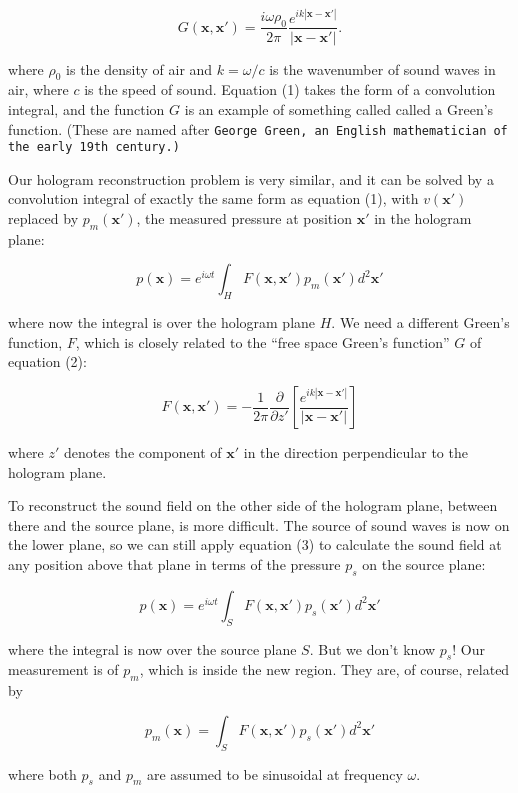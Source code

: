   $$G(\mathbf{x},\mathbf{x'})= \dfrac{i \omega \rho_0}{2 \pi}\dfrac{e^{i k 
  |\mathbf{x}-\mathbf{x'}|}}{|\mathbf{x}-\mathbf{x'}|} . \tag{2}$$ 

  where $\rho_0$ is the density of air and $k=\omega/c$ is the wavenumber of 
  sound waves in air, where $c$ is the speed of sound. Equation (1) takes the 
  form of a convolution integral, and the function $G$ is an example of 
  something called called a Green's function. (These are named after 
  \tt{}George Green\rm{}, an English mathematician of the early 19th century.) 

  Our hologram reconstruction problem is very similar, and it can be solved by 
  a convolution integral of exactly the same form as equation (1), with 
  $v(\mathbf{x'})$ replaced by $p_m(\mathbf{x'})$, the measured pressure at 
  position $\mathbf{x'}$ in the hologram plane: 

  $$p(\mathbf{x}) = e^{i \omega t} \int_H{F(\mathbf{x},\mathbf{x'}) 
  p_m(\mathbf{x'}) d^2 \mathbf{x'}} \tag{3}$$ 

  where now the integral is over the hologram plane $H$. We need a different 
  Green's function, $F$, which is closely related to the ``free space Green's 
  function'' $G$ of equation (2): 

  $$F(\mathbf{x},\mathbf{x'})=- \dfrac{1}{2 \pi} \dfrac{\partial}{\partial 
  z'}\left[ \dfrac{e^{i k 
  |\mathbf{x}-\mathbf{x'}|}}{|\mathbf{x}-\mathbf{x'}|}\right] \tag{4}$$ 

  where $z'$ denotes the component of $\mathbf{x'}$ in the direction 
  perpendicular to the hologram plane. 

  To reconstruct the sound field on the other side of the hologram plane, 
  between there and the source plane, is more difficult. The source of sound 
  waves is now on the lower plane, so we can still apply equation (3) to 
  calculate the sound field at any position above that plane in terms of the 
  pressure $p_s$ on the source plane: 

  $$p(\mathbf{x}) = e^{i \omega t} \int_S{F(\mathbf{x},\mathbf{x'}) 
  p_s(\mathbf{x'}) d^2 \mathbf{x'}} \tag{5}$$ 

  where the integral is now over the source plane $S$. But we don't know $p_s$! 
  Our measurement is of $p_m$, which is inside the new region. They are, of 
  course, related by 

  $$p_m(\mathbf{x}) = \int_S{F(\mathbf{x},\mathbf{x'}) p_s(\mathbf{x'}) d^2 
  \mathbf{x'}} \tag{6}$$ 

  where both $p_s$ and $p_m$ are assumed to be sinusoidal at frequency 
  $\omega$. 

